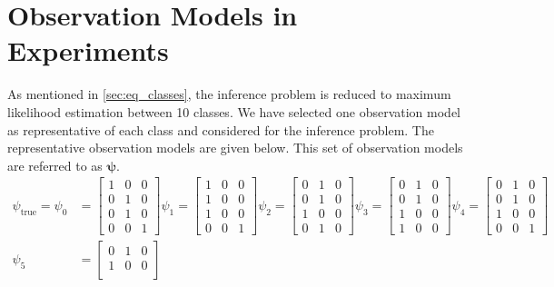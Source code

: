 \section*{Observation Models in Experiments}
As mentioned in \cref{sec:eq_classes}, the inference problem is reduced to maximum likelihood estimation between 10 classes. We have selected one observation model as representative of each class and considered for the inference problem. The representative observation models are given below. This set of observation models are referred to as $ \boldsymbol{\psi} $.
\begin{align}
\psi_{\text{true}} = \psi_{0} &=
\begin{bmatrix}
1 & 0 & 0 \\
0 & 1 & 0 \\
0 & 1 & 0 \\
0 & 0 & 1
\end{bmatrix}
\psi_{1} =
\begin{bmatrix}
1 & 0 & 0 \\
1 & 0 & 0 \\
1 & 0 & 0 \\
0 & 0 & 1
\end{bmatrix}
\psi_{2} =
\begin{bmatrix}
0 & 1 & 0 \\
0 & 1 & 0 \\
1 & 0 & 0 \\
0 & 1 & 0
\end{bmatrix}
\psi_{3} =
\begin{bmatrix}
0 & 1 & 0 \\
0 & 1 & 0 \\
1 & 0 & 0 \\
1 & 0 & 0
\end{bmatrix}
\psi_{4} =
\begin{bmatrix}
0 & 1 & 0 \\
0 & 1 & 0 \\
1 & 0 & 0 \\
0 & 0 & 1
\end{bmatrix} \nonumber\\
\psi_{5} &=
\begin{bmatrix}
0 & 1 & 0 \\
1 & 0 & 0 \\

\end{bmatrix}
\end{align}
